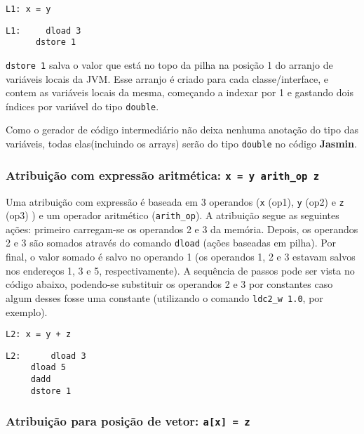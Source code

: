 \begin{lstlisting}[caption=Operação de atribuição em código intermediário.]
L1:	x = y
\end{lstlisting}


\begin{lstlisting}[caption=Operação de atribuição simples em Jasmin.]
L1:		dload 3
      dstore 1
\end{lstlisting}

\texttt{dstore 1} salva o valor que está no topo da pilha na posição 1 do arranjo de variáveis locais da JVM. Esse arranjo é criado para cada classe/interface, e contem as variáveis locais da mesma, começando a indexar por 1 e gastando dois índices por variável do tipo \texttt{double}. 

Como o gerador de código intermediário não deixa nenhuma anotação do tipo das variáveis, todas elas(incluindo os arrays) serão do tipo \texttt{double} no código \textbf{Jasmin}.

\subsubsection{Atribuição com expressão aritmética: \texttt{x = y arith\_op z} }

Uma atribuição com expressão é baseada em 3 operandos (\texttt{x} (op1), \texttt{y} (op2) e \texttt{z} (op3) ) e um operador aritmético (\texttt{arith\_op}). A atribuição segue as seguintes ações: primeiro carregam-se os operandos 2 e 3 da memória. Depois, os operandos 2 e 3 são somados através do comando \texttt{dload} (ações baseadas em pilha). Por final, o valor somado é salvo no operando 1 (os operandos 1, 2 e 3 estavam salvos nos endereços 1, 3 e 5, respectivamente). A sequência de passos pode ser vista no código abaixo, podendo-se substituir os operandos 2 e 3 por constantes caso algum desses fosse uma constante (utilizando o comando \texttt{ldc2\_w 1.0}, por exemplo).


\begin{lstlisting}[caption=Operação de atribuição com expressão aritmética em código intermediário.]
L2:	x = y + z
\end{lstlisting}


\begin{lstlisting}[caption=Operação de atribuição com expressão aritmética em Jasmin.]
L2:	     dload 3
     dload 5
     dadd
     dstore 1
\end{lstlisting}


\subsubsection{Atribuição para posição de vetor: \texttt{a[x] = z} }

